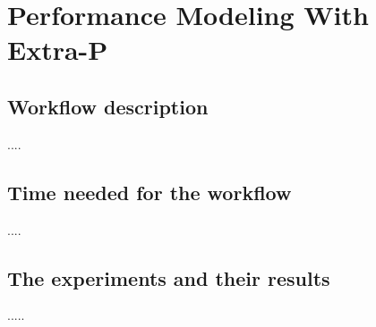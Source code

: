 \section{Performance Modeling With Extra-P}
\label{sec:extra-p}


\subsection{Workflow description}
....

\subsection{Time needed for the workflow}
....

\subsection{The experiments and their results}
.....